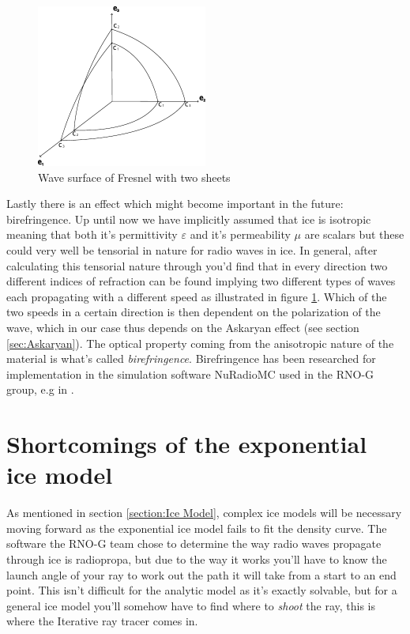 \begin{figure}
  \centering
  \includegraphics[width=0.5\textwidth]{figures/Fresnel.pdf}
  \caption{Wave surface of Fresnel with two sheets}
  \label{fig:Fresnel}
\end{figure}
Lastly there is an effect which might become important in the future:
birefringence.  Up until now we have implicitly assumed that ice is isotropic
meaning that both it's permittivity $\varepsilon$ and it's permeability $\mu$
are scalars but these could very well be tensorial in nature for radio waves in
ice. In general, after calculating this tensorial nature through you'd find
that in every direction two different indices of refraction can be found
implying two different types of waves each propagating with a different speed
as illustrated in figure \ref{fig:Fresnel}. Which of the two speeds in a
certain direction is then dependent on the polarization of the wave, which in
our case thus depends on the Askaryan effect (see section \ref{sec:Askaryan}).
The optical property coming from the anisotropic nature of the material is
what's called \textit{birefringence}.  Birefringence has been
researched for implementation in the simulation software NuRadioMC used in the
RNO-G group, e.g in \cite{Heyer2023}.
\section{Shortcomings of the exponential ice model}
As mentioned in section \ref{section:Ice Model}, complex ice models will be
necessary moving forward as the exponential ice model fails to fit the density
curve.  The software the RNO-G team chose to determine the way radio waves
propagate through ice is radiopropa\cite{Winchen_2019}, but due to the way it
works you'll have to know the launch angle of your ray to work out the path it
will take from a start to an end point. This isn't difficult for the analytic
model as it's exactly solvable, but for a general ice model you'll somehow have
to find where to \textit{shoot} the ray, this is where the Iterative ray tracer
comes in.
